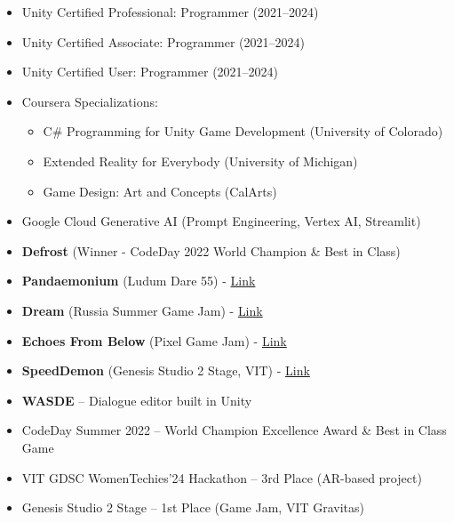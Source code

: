 \documentclass[9pt]{developercv}
\newenvironment{tightemize}
{
	\begin{itemize}
		\setlength{\itemsep}{0pt}
		\setlength{\parskip}{0pt}
		\setlength{\parsep}{0pt}     
	}
	{ 
	\end{itemize}                  
}
\begin{document}
	
	
	\begin{itemize}
		\item Unity Certified Professional: Programmer (2021--2024)
		\item Unity Certified Associate: Programmer (2021--2024)
		\item Unity Certified User: Programmer (2021--2024)
		\item Coursera Specializations:
		\begin{tightemize}
			\item C\# Programming for Unity Game Development (University of Colorado)
			\item Extended Reality for Everybody (University of Michigan)
			\item Game Design: Art and Concepts (CalArts)
		\end{tightemize}
		\item Google Cloud Generative AI (Prompt Engineering, Vertex AI, Streamlit)
	\end{itemize}
	
	
	\begin{itemize}
		\item \textbf{Defrost} (Winner - CodeDay 2022 World Champion \& Best in Class)
		\item \textbf{Pandaemonium} (Ludum Dare 55) - \href{https://graphicmismatch.itch.io/pandaemonium}{Link}
		\item \textbf{Dream} (Russia Summer Game Jam) - \href{https://graphicmismatch.itch.io/dream}{Link}
		\item \textbf{Echoes From Below} (Pixel Game Jam) - \href{https://rzenn.itch.io/echoes-from-below}{Link}
		\item \textbf{SpeedDemon} (Genesis Studio 2 Stage, VIT) - \href{https://graphicmismatch.itch.io/speeddemon}{Link}
		\item \textbf{WASDE} – Dialogue editor built in Unity
	\end{itemize}
	
	
	\begin{itemize}
		\item CodeDay Summer 2022 – World Champion Excellence Award \& Best in Class Game
		\item VIT GDSC WomenTechies'24 Hackathon – 3rd Place (AR-based project)
		\item Genesis Studio 2 Stage – 1st Place (Game Jam, VIT Gravitas)
	\end{itemize}
	
\end{document}
